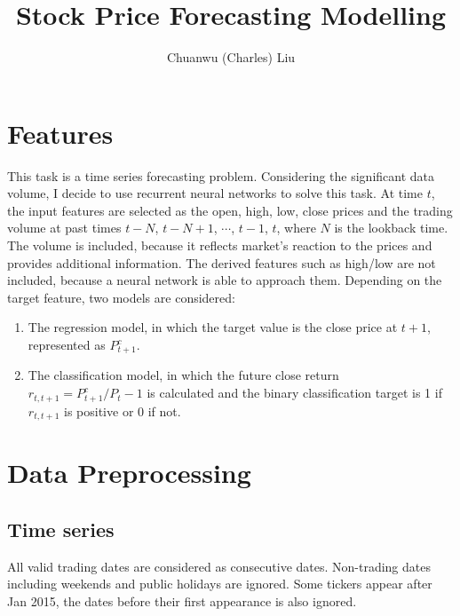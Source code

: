 \documentclass[a4paper, 11pt, usenatbib]{article}
\begin{document}
\title{Stock Price Forecasting Modelling}
\author{Chuanwu (Charles) Liu}

\maketitle



\section{Features}
This task is a time series forecasting problem. Considering the significant data volume, I decide to use recurrent neural networks to solve this task. At time $t$, the input features are selected as the open, high, low, close prices and the trading volume at past times $t-N$, $t-N+1$, $\cdots$, $t-1$, $t$, where $N$ is the lookback time. The volume is included, because it reflects market's reaction to the prices and provides additional information. The derived features such as high/low are not included, because a neural network is able to approach them.
Depending on the target feature, two models are considered:
\begin{enumerate}
\item The regression model, in which the target value is the close price at $t+1$, represented as $P_{t+1}^c$.

\item The classification model, in which the future close return $r_{t, t+1} = P_{t+1}^c / P_t - 1$ is calculated and the binary classification target is 1 if $r_{t, t+1}$ is positive or 0 if not. 
\end{enumerate}

\section{Data Preprocessing}
\subsection{Time series}
All valid trading dates are considered as consecutive dates. Non-trading dates including weekends and public holidays are ignored. Some tickers appear after Jan 2015, the dates before their first appearance is also ignored.
\end{document}
